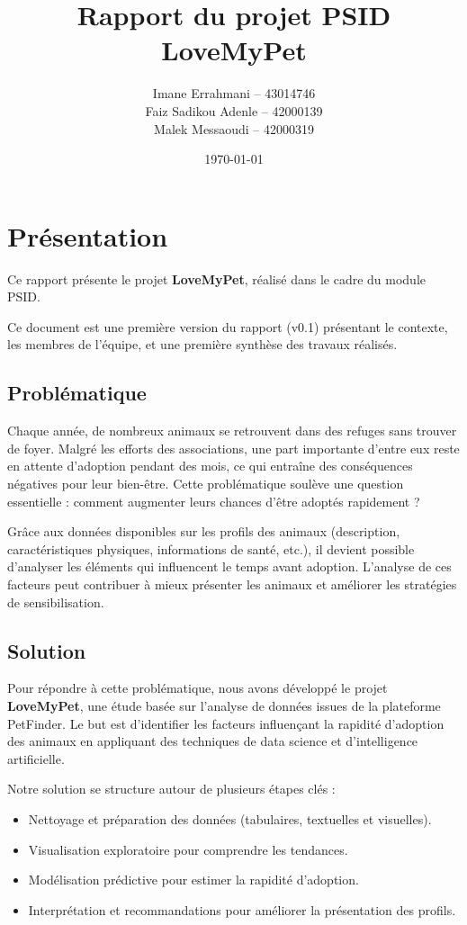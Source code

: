 \documentclass[a4paper,12pt]{article}
\title{\textbf{Rapport du projet PSID }\\ \Large LoveMyPet}
\author{
    Imane Errahmani -- 43014746 \\
    Faiz Sadikou Adenle -- 42000139 \\
    Malek Messaoudi -- 42000319
}
\date{\today}
\begin{document}
\maketitle
\thispagestyle{empty}
\clearpage  %

\tableofcontents
\thispagestyle{empty}
\clearpage

\section {Présentation}

Ce rapport présente le projet \textbf{LoveMyPet}, réalisé dans le cadre du module PSID.

Ce document est une première version du rapport (v0.1) présentant le contexte, les membres de l’équipe, et une première synthèse des travaux réalisés.

\subsection {Problématique}

Chaque année, de nombreux animaux se retrouvent dans des refuges sans trouver de foyer. Malgré les efforts des associations, une part importante d’entre eux reste en attente d’adoption pendant des mois, ce qui entraîne des conséquences négatives pour leur bien-être. Cette problématique soulève une question essentielle : comment augmenter leurs chances d’être adoptés rapidement ?

Grâce aux données disponibles sur les profils des animaux (description, caractéristiques physiques, informations de santé, etc.), il devient possible d’analyser les éléments qui influencent le temps avant adoption. L’analyse de ces facteurs peut contribuer à mieux présenter les animaux et améliorer les stratégies de sensibilisation.

\subsection {Solution}

Pour répondre à cette problématique, nous avons développé le projet \textbf{LoveMyPet}, une étude basée sur l’analyse de données issues de la plateforme PetFinder. Le but est d’identifier les facteurs influençant la rapidité d’adoption des animaux en appliquant des techniques de data science et d’intelligence artificielle.

Notre solution se structure autour de plusieurs étapes clés :
\begin{itemize}
    \item Nettoyage et préparation des données (tabulaires, textuelles et visuelles).
    \item Visualisation exploratoire pour comprendre les tendances.
    \item Modélisation prédictive pour estimer la rapidité d’adoption.
    \item Interprétation et recommandations pour améliorer la présentation des profils.
\end{itemize}
\end{document}
